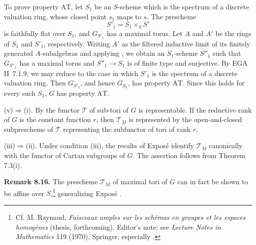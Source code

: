 To prove property \(\mathrm{AT}\), let \(S_1\) be an \(S\)-scheme
which is the spectrum of a discrete valuation ring, whose closed
point \(s_1\) maps to \(s\). The prescheme
\[
  S'_1=S_1\times_S S'
\]
is faithfully flat over \(S_1\), and \(G_{S'_1}\) has a maximal
torus. Let \(A\) and \(A'\) be the rings of \(S_1\) and \(S'_1\),
respectively. Writing \(A'\) as the filtered inductive limit of its
finitely generated \(A\)-subalgebras and applying ,
we obtain an \(S_1\)-scheme \(S''_1\) such that
\(G_{S''_1}\) has a maximal torus and
\(S''_1\to S_1\) is of finite type and surjective. By
EGA II~7.1.9, we may reduce to the case in which \(S'_1\) is the
spectrum of a discrete valuation ring. Then \(G_{S'_1}\), and
hence \(G_{S_1}\), has property \(\mathrm{AT}\). Since this holds
for every such \(S_1\), \(G\) has property \(\mathrm{AT}\).

\textup{(v)}\(\Rightarrow\)\textup{(i)}.
By  the functor \(\mathcal T\) of sub-tori of \(G\) is
representable. If the reductive rank of \(G\) is the constant
function \(r\), then \(\mathcal T_M\) is represented by the
open-and-closed subprescheme of \(\mathcal T\) representing the
subfunctor of tori of rank \(r\).

\textup{(iii)}\(\Rightarrow\)\textup{(ii)}.
Under condition \textup{(iii)}, the results of Exposé 
identify \(\mathcal T_M\) canonically with the functor of Cartan
subgroups of \(G\). The assertion follows from Theorem 7.3(i).

\medskip\noindent\textbf{Remark 8.16.}
The prescheme \(\mathcal T_M\) of maximal tori of \(G\) can in fact
be shown to be affine over \(S\),\footnote{Cf. M. Raynaud,
\emph{Faisceaux amples sur les schémas en groupes et les espaces
homogènes} (thesis, forthcoming). Editor's note: see
\emph{Lecture Notes in Mathematics} 119 (1970), Springer,
especially .} generalizing Exposé .


